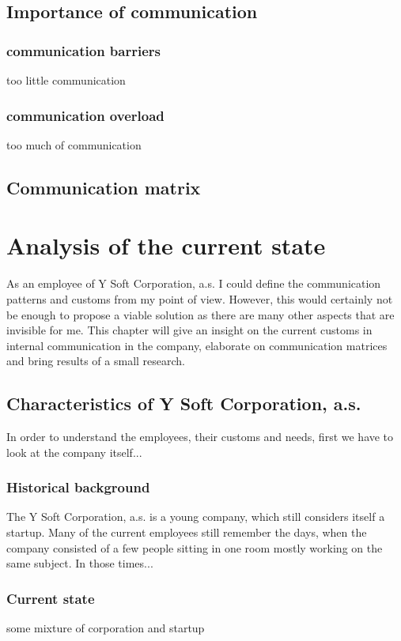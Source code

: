 \documentclass[11pt,singleside]{myfithesis2}
\begin{document}
	\section{Importance of communication}
	
		\subsection{communication barriers}
too little communication

		\subsection{communication overload}
too much of communication
	
	\section{Communication matrix}

\chapter{Analysis of the current state}

As an employee of Y Soft Corporation, a.s. I could define the communication patterns and customs from my point of view. However, this would certainly not be enough to propose a viable solution as there are many other aspects that are invisible for me. This chapter will give an insight on the current customs in internal communication in the company, elaborate on communication matrices and bring results of a small research.

	\section{Characteristics of Y Soft Corporation, a.s.}
In order to understand the employees, their customs and needs, first we have to look at the company itself...

		\subsection{Historical background}
The Y Soft Corporation, a.s. is a young company, which still considers itself a startup. Many of the current employees still remember the days, when the company consisted of a few people sitting in one room mostly working on the same subject. In those times...

		\subsection{Current state}
some mixture of corporation and startup
\end{document}
